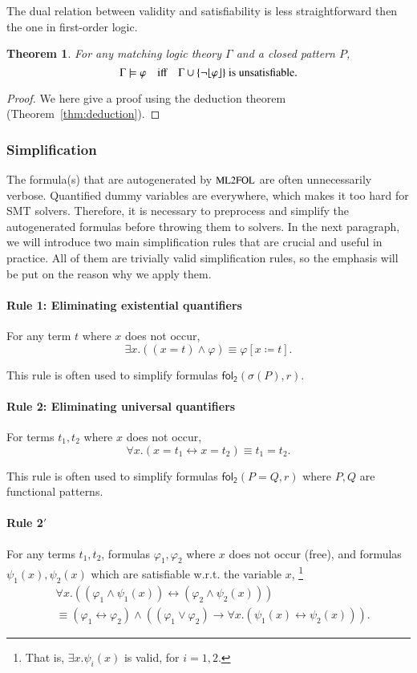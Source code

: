 \documentclass{article}
\theoremstyle{plain}
\newtheorem{thm}{Theorem}
\DeclarePairedDelimiter\floor{\lfloor}{\rfloor}
\def\foltwo{\mathsf{fol_2}}
\def\MLFOL{\text{\small ML2FOL}}
\begin{document}
The dual relation between validity and satisfiability is less straightforward then the one in first-order logic. 

\begin{thm}
	For any matching logic theory $\Gamma$ and a closed pattern $P$,
	\begin{equation*}
	\Gamma \models \varphi \quad \text{iff} \quad  \Gamma \cup \{\neg \floor{\varphi}\} \text{ is unsatisfiable.}
	\end{equation*}
\end{thm}
\begin{proof}
	We here give a proof using the deduction theorem (Theorem~\ref{thm:deduction}). 
\end{proof}

\subsubsection*{Simplification}
The formula(s) that are autogenerated by $\MLFOL$ are often unnecessarily verbose. Quantified dummy variables are everywhere, which makes it too hard for SMT solvers. Therefore, it is necessary to preprocess and simplify the autogenerated formulas before throwing them to solvers. In the next paragraph, we will introduce two main simplification rules that are crucial and useful in practice. All of them are trivially valid simplification rules, so the emphasis will be put on the reason why we apply them.

\paragraph{Rule 1: Eliminating existential quantifiers}
For any term $t$ where $x$ does not occur, 
$$\exists x . ((x = t) \wedge \varphi) \equiv \varphi[x \coloneqq t]. $$

This rule is often used to simplify formulas $\foltwo(\sigma(P), r)$.

\paragraph{Rule 2: Eliminating universal quantifiers}
For terms $t_1, t_2$ where $x$ does not occur,
$$\forall x . (x = t_1 \leftrightarrow x = t_2) \equiv t_1 = t_2.$$

This rule is often used to simplify formulas $\foltwo(P = Q, r)$ where $P, Q$ are functional patterns.

\paragraph{Rule 2$'$}
For any terms $t_1, t_2$, formulas $\varphi_1, \varphi_2$ where $x$ does not occur (free), and formulas $\psi_1(x), \psi_2(x)$ which are satisfiable w.r.t. the variable $x$, \footnote{That is, $\exists x . \psi_i(x)$ is valid, for $i = 1, 2$.}
\begin{align*}
      & \forall x . \left((\varphi_1 \wedge \psi_1(x)) \leftrightarrow (\varphi_2 \wedge \psi_2(x))\right)\\
&\equiv (\varphi_1 \leftrightarrow \varphi_2) \wedge ((\varphi_1 \vee \varphi_2) \rightarrow \forall x . (\psi_1(x) \leftrightarrow \psi_2(x))).
\end{align*}
\end{document}
